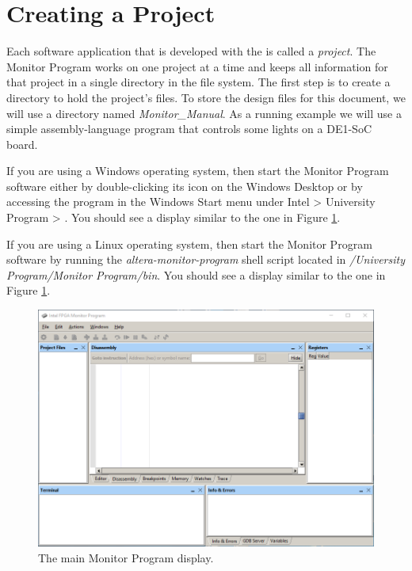 \documentclass[11pt, twoside, pdftex]{article}
\begin{document}
\section{Creating a Project}
\label{tut:start}

Each software application that is developed with the
\productNameMed{} is called a {\it project}. 
The Monitor Program works on one project at a time and keeps all information for that project in a single directory in the file
system. The first step is to create a directory to hold the project's files. To store the design files for this document, 
we will use a directory named {\it Monitor\_Manual}. 
As a running example we will use a simple assembly-language
program that controls some lights on a DE1-SoC board.

If you are using a Windows operating system, then
start the Monitor Program software either by double-clicking its
icon on the Windows Desktop or by accessing the program in the
{\sf Windows Start} menu under 
{\sf Intel > University Program > \productNameMed{}}. 
You should see a display similar to the one in Figure \ref{fig:AMP_maindisplay}.

If you are using a Linux operating system, then
start the Monitor Program software by running the
{\it altera-monitor-program} shell script located in
{\it <path to Intel software>/University Program/Monitor Program/bin}.
You should see a display similar to the one in Figure \ref{fig:AMP_maindisplay}.

\begin{figure}[H]
   \begin{center}
      \includegraphics[scale=0.6]{screenshots/figure3.png}
   \end{center}
   \caption{The main Monitor Program display.} 
   \label{fig:AMP_maindisplay}
\end{figure}
\end{document}
